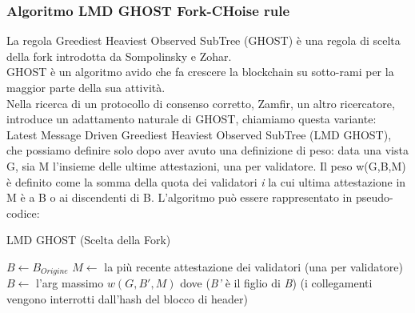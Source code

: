 \documentclass[a4paper,11pt]{report}
\begin{document}
\subsubsection{Algoritmo LMD GHOST Fork-CHoise rule}
La regola Greediest Heaviest Observed SubTree (GHOST) è una regola di scelta della fork introdotta da Sompolinsky e Zohar.\\ GHOST è un algoritmo avido che fa crescere la blockchain su sotto-rami per la maggior parte della sua attività.\\ Nella ricerca di un protocollo di consenso corretto, Zamfir, un altro ricercatore, introduce un adattamento naturale di GHOST, chiamiamo questa variante: Latest Message Driven Greediest Heaviest Observed SubTree (LMD GHOST), che possiamo definire solo dopo aver avuto una definizione di peso:
data una vista G, sia M l'insieme delle ultime attestazioni, una per validatore. Il peso w(G,B,M) è definito come la somma della quota dei validatori \textit{i} la cui ultima attestazione in M è a B o ai discendenti di B.
L'algoritmo può essere rappresentato in pseudo-codice:\\

\begin{algorithm}
\caption{LMD GHOST (Scelta della Fork)}
\begin{algorithmic}[1]
\State $B \gets B_{Origine} $
\State $M \gets $ la più recente attestazione dei validatori (una per validatore)
\State $B \gets $ l'arg massimo $w(G,B',M)$ dove (\textit{B'} è il figlio di \textit{B})
\State (i collegamenti vengono interrotti dall'hash del blocco di header)
\EndWhile \\
\EndProcedure
\end{algorithmic} 
\end{algorithm}
\end{document}
